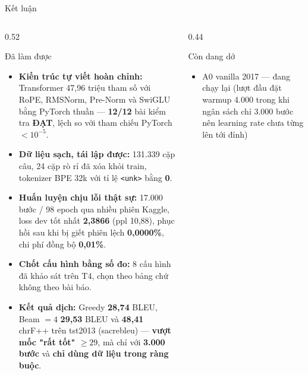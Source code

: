 \documentclass[aspectratio=169, 10pt]{beamer}
\DeclareRobustCommand{\xong}{\textcolor{MLIOTnavy}{\textbf{ĐẠT}}}
\DeclareRobustCommand{\tk}[1]{\texttt{\textless #1\textgreater}}
\begin{document}
\begin{frame}[shrink=15]{Kết luận}
  \begin{columns}[T]
    \begin{column}{0.52\textwidth}
      \begin{block}{Đã làm được}
        \footnotesize
        \begin{itemize}
          \setlength{\itemsep}{0.3em}
          \item \textbf{Kiến trúc tự viết hoàn chỉnh:} Transformer 47{,}96 triệu tham
            số với RoPE, RMSNorm, Pre-Norm và SwiGLU bằng PyTorch thuần —
            \textbf{12/12} bài kiểm tra \xong{}, lệch so với tham chiếu PyTorch
            $< 10^{-5}$.
          \item \textbf{Dữ liệu sạch, tái lập được:} 131.339 cặp câu, 24 cặp rò rỉ đã
            xóa khỏi train, tokenizer BPE 32k với tỉ lệ \tk{unk} bằng \textbf{0}.
          \item \textbf{Huấn luyện chịu lỗi thật sự:} 17.000 bước / 98 epoch qua nhiều
            phiên Kaggle, loss dev tốt nhất \textbf{2{,}3866} (ppl 10{,}88), phục hồi
            sau khi bị giết phiên lệch \textbf{0{,}0000\%}, chi phí đồng bộ
            \textbf{0{,}01\%}.
          \item \textbf{Chốt cấu hình bằng số đo:} 8 cấu hình đã khảo sát trên T4, chọn
            theo bảng chứ không theo bài báo.
          \item \textbf{Kết quả dịch:} Greedy \textbf{28{,}74} BLEU, Beam $=4$
            \textbf{29{,}53} BLEU và \textbf{48{,}41} chrF++ trên tst2013
            (sacrebleu) — \textbf{vượt mốc "rất tốt" $\ge 29$}, mà chỉ với
            \textbf{3.000 bước} và \textbf{chỉ dùng dữ liệu trong ràng buộc}.
        \end{itemize}
      \end{block}
    \end{column}
    \begin{column}{0.44\textwidth}
      \begin{block}{Còn dang dở}
        \footnotesize
        \begin{itemize}
          \setlength{\itemsep}{0.2em}
          \item A0 vanilla 2017 — đang chạy lại (lượt đầu đặt warmup 4.000 trong
            khi ngân sách chỉ 3.000 bước nên learning rate chưa từng lên tới đỉnh)
        \end{itemize}

\end{block}
\end{column}
\end{columns}
\end{frame}
\end{document}

